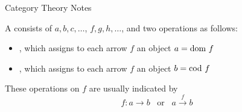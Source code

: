 \documentclass[11pt,letterpaper]{jacky}
\begin{document}
\begin{center}
    \vspace*{20pt}
    \LARGE{Category Theory Notes}
\end{center}

\begin{defi}
    A  consists of  $a, b, c, \ldots$,
     $f, g, h, \ldots$, and two operations as follows:
    \begin{itemize}
        \item {}, which assigns to each arrow $f$ an object
            $a=\text{dom }f$
        \item {}, which assigns to each arrow $f$ an object
            $b=\text{cod }f$
    \end{itemize}
    These operations on $f$ are usually indicated by
    \[f:a\rightarrow b\hspace{10pt}\text{or}\hspace{10pt}a\xrightarrow{f}b\]
\end{defi}
\end{document}
